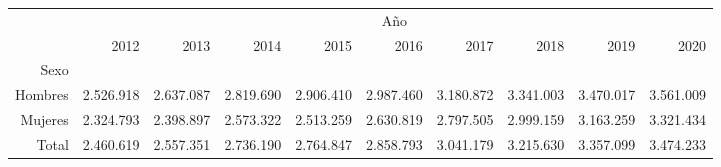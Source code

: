 \begin{tabular}{llllllllll}
\cline{1-10}
\multicolumn{1}{c}{} &
  \multicolumn{9}{|c}{Año} \\
\multicolumn{1}{c}{} &
  \multicolumn{1}{|r}{2012} &
  \multicolumn{1}{r}{2013} &
  \multicolumn{1}{r}{2014} &
  \multicolumn{1}{r}{2015} &
  \multicolumn{1}{r}{2016} &
  \multicolumn{1}{r}{2017} &
  \multicolumn{1}{r}{2018} &
  \multicolumn{1}{r}{2019} &
  \multicolumn{1}{r}{2020} \\
\cline{1-10}
\multicolumn{1}{r}{Sexo} &
  \multicolumn{1}{|r}{} &
  \multicolumn{1}{r}{} &
  \multicolumn{1}{r}{} &
  \multicolumn{1}{r}{} &
  \multicolumn{1}{r}{} &
  \multicolumn{1}{r}{} &
  \multicolumn{1}{r}{} &
  \multicolumn{1}{r}{} &
  \multicolumn{1}{r}{} \\
\multicolumn{1}{r}{Hombres\hspace{1em}} &
  \multicolumn{1}{|r}{2.526.918} &
  \multicolumn{1}{r}{2.637.087} &
  \multicolumn{1}{r}{2.819.690} &
  \multicolumn{1}{r}{2.906.410} &
  \multicolumn{1}{r}{2.987.460} &
  \multicolumn{1}{r}{3.180.872} &
  \multicolumn{1}{r}{3.341.003} &
  \multicolumn{1}{r}{3.470.017} &
  \multicolumn{1}{r}{3.561.009} \\
\multicolumn{1}{r}{Mujeres\hspace{1em}} &
  \multicolumn{1}{|r}{2.324.793} &
  \multicolumn{1}{r}{2.398.897} &
  \multicolumn{1}{r}{2.573.322} &
  \multicolumn{1}{r}{2.513.259} &
  \multicolumn{1}{r}{2.630.819} &
  \multicolumn{1}{r}{2.797.505} &
  \multicolumn{1}{r}{2.999.159} &
  \multicolumn{1}{r}{3.163.259} &
  \multicolumn{1}{r}{3.321.434} \\
\multicolumn{1}{r}{Total\hspace{1em}} &
  \multicolumn{1}{|r}{2.460.619} &
  \multicolumn{1}{r}{2.557.351} &
  \multicolumn{1}{r}{2.736.190} &
  \multicolumn{1}{r}{2.764.847} &
  \multicolumn{1}{r}{2.858.793} &
  \multicolumn{1}{r}{3.041.179} &
  \multicolumn{1}{r}{3.215.630} &
  \multicolumn{1}{r}{3.357.099} &
  \multicolumn{1}{r}{3.474.233} \\
\cline{1-10}
\end{tabular}

